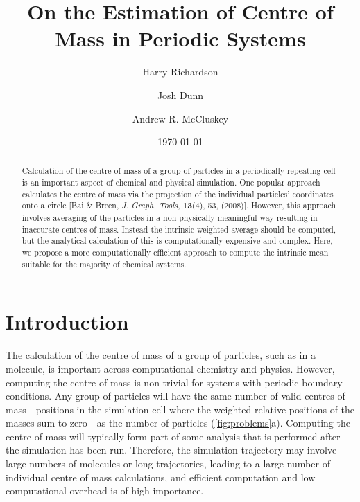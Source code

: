 \documentclass[reprint,superscriptaddress,nobibnotes,amsmath,amssymb,aip]{revtex4-2}
\newcommand{\papertitle}{On the Estimation of Centre of Mass in Periodic Systems}
\begin{document}
\let\oldaddcontentsline\addcontentsline
\renewcommand{\addcontentsline}[3]{}

\title[Accurate Centre of Mass Estimation]{\papertitle}

\author{Harry Richardson}
\author{Josh Dunn}
\author{Andrew R. McCluskey}

\date{\today}

\begin{abstract}
Calculation of the centre of mass of a group of particles in a periodically-repeating cell is an important aspect of chemical and physical simulation. 
One popular approach calculates the centre of mass via the projection of the individual particles' coordinates onto a circle [Bai \& Breen, \emph{J. Graph. Tools}, \textbf{13}(4), 53, (2008)].
However, this approach involves averaging of the particles in a non-physically meaningful way resulting in inaccurate centres of mass. 
Instead the intrinsic weighted average should be computed, but the analytical calculation of this is computationally expensive and complex. 
Here, we propose a more computationally efficient approach to compute the intrinsic mean suitable for the majority of chemical systems. 
\end{abstract}

\maketitle

\section{Introduction}
\label{sec:intro}

The calculation of the centre of mass of a group of particles, such as in a molecule, is important across computational chemistry and physics.\cite{zhang_chemically_2024,happel_coordinated_2024,maggi_universality_2021,grillo_molecular_2023,bullerjahn_unwrapping_2023,jaeger-honz_systematic_2024}
However, computing the centre of mass is non-trivial for systems with periodic boundary conditions. 
Any group of particles will have the same number of valid centres of mass---positions in the simulation cell where the weighted relative positions of the masses sum to zero---as the number of particles (\cref{fig:problems}a). 
Computing the centre of mass will typically form part of some analysis that is performed after the simulation has been run. 
Therefore, the simulation trajectory may involve large numbers of molecules or long trajectories, leading to a large number of individual centre of mass calculations, and efficient computation and low computational overhead is of high importance. 
\end{document}
